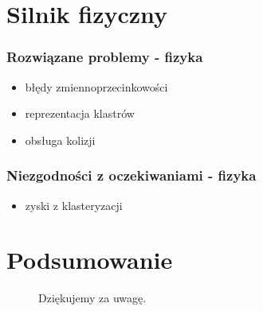 \documentclass{beamer}
\begin{document}
\section{Silnik fizyczny}\label{sec:silnik fizyczny}

\frame
{
	\frametitle{Rozwiązane problemy - fizyka}
	\begin{itemize}
	\item błędy zmiennoprzecinkowości
	\item reprezentacja klastrów
	\item obsługa kolizji
	\end{itemize}
}

\frame
{
	\frametitle{Niezgodności z oczekiwaniami - fizyka}
	\begin{itemize}
	\item zyski z klasteryzacji
	\end{itemize}
}

\section{Podsumowanie}\label{sec:podsumowanie}

\frame
{
	\begin{figure}
	\centering
	Dziękujemy za uwagę.
	\end{figure}
}
\end{document}
